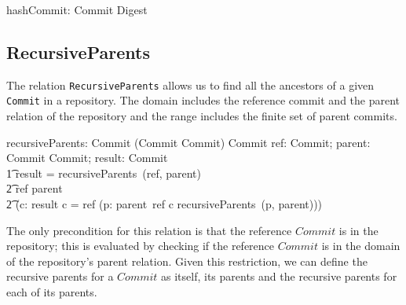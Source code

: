 \begin{axdef}
  hashCommit: Commit \surj Digest
\end{axdef}

\subsection{RecursiveParents}

The relation \texttt{RecursiveParents} allows us to find all the ancestors of a given
\texttt{Commit} in a repository. The domain includes the reference commit and the parent
relation of the repository and the range includes the finite set of parent commits.

\begin{axdef}
  recursiveParents: Commit \cross (Commit \pfun \power Commit) \pfun \finset Commit
\where
  \exists ref: Commit; parent: Commit \pfun \power Commit; result: \finset Commit \spot \\
  \t1 result = recursiveParents~(ref, parent) \iff \\
    \t2 ref \in \dom parent \land \\
    \t2 (\forall c: result \spot c = ref \lor (\exists p: parent~ref \spot c \in recursiveParents~(p, parent)))
\end{axdef}

The only precondition for this relation is that the reference $Commit$ is in the
repository; this is evaluated by checking if the reference $Commit$ is in the
domain of the repository's parent relation. Given this restriction, we can
define the recursive parents for a $Commit$ as itself, its parents and the
recursive parents for each of its parents.
